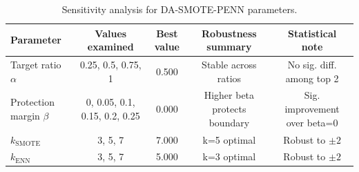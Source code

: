 \begin{table}[htb]
\centering
\caption{Sensitivity analysis for DA-SMOTE-PENN parameters.}
\label{tab:sensitivity}
\small
\begin{tabular}{lcccc}
\toprule
Parameter & Values examined & Best value & Robustness summary & Statistical note
\\
\midrule
Target ratio $\alpha$ & 0.25, 0.5, 0.75, 1 & 0.500 & Stable across ratios & No sig. diff. among top 2
\\
Protection margin $\beta$ & 0, 0.05, 0.1, 0.15, 0.2, 0.25 & 0.000 & Higher beta protects boundary & Sig. improvement over beta=0
\\
$k_{\mathrm{SMOTE}}$ & 3, 5, 7 & 7.000 & k=5 optimal & Robust to $\pm 2$
\\
$k_{\mathrm{ENN}}$ & 3, 5, 7 & 5.000 & k=3 optimal & Robust to $\pm 2$
\\
\bottomrule
\end{tabular}
\end{table}

